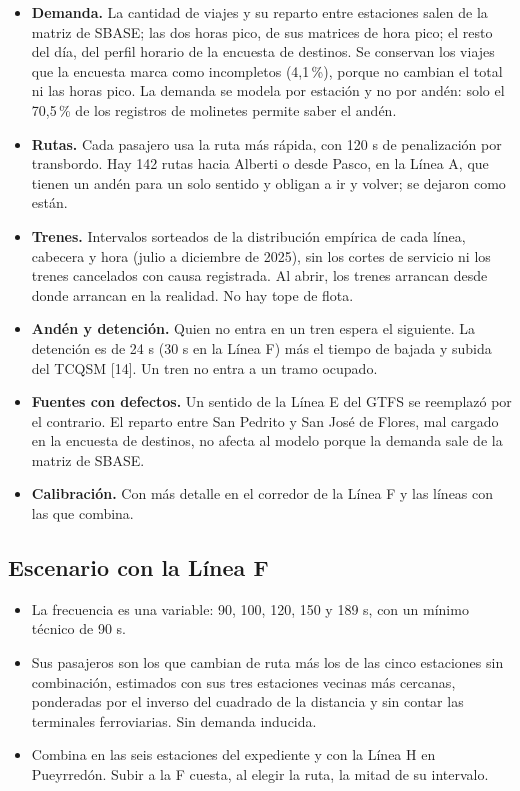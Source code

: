\documentclass{article}
\begin{document}
\begin{itemize}
  \item \textbf{Demanda.} La cantidad de viajes y su reparto entre estaciones salen de la matriz de SBASE; las
    dos horas pico, de sus matrices de hora pico; el resto del día, del perfil horario de la encuesta de
    destinos. Se conservan los viajes que la encuesta marca como incompletos (4,1\,\%), porque no cambian el
    total ni las horas pico. La demanda se modela por estación y no por andén: solo el 70,5\,\% de los
    registros de molinetes permite saber el andén.
  \item \textbf{Rutas.} Cada pasajero usa la ruta más rápida, con 120 s de penalización por transbordo. Hay
    142 rutas hacia Alberti o desde Pasco, en la Línea A, que tienen un andén para un solo sentido y obligan
    a ir y volver; se dejaron como están.
  \item \textbf{Trenes.} Intervalos sorteados de la distribución empírica de cada línea, cabecera y hora
    (julio a diciembre de 2025), sin los cortes de servicio ni los trenes cancelados con causa registrada.
    Al abrir, los trenes arrancan desde donde arrancan en la realidad. No hay tope de flota.
  \item \textbf{Andén y detención.} Quien no entra en un tren espera el siguiente. La detención es de 24 s
    (30 s en la Línea F) más el tiempo de bajada y subida del TCQSM [14]. Un tren no entra a un tramo ocupado.
  \item \textbf{Fuentes con defectos.} Un sentido de la Línea E del GTFS se reemplazó por el contrario. El
    reparto entre San Pedrito y San José de Flores, mal cargado en la encuesta de destinos, no afecta al
    modelo porque la demanda sale de la matriz de SBASE.
  \item \textbf{Calibración.} Con más detalle en el corredor de la Línea F y las líneas con las que combina.
\end{itemize}

\subsection*{Escenario con la Línea F}

\begin{itemize}
  \item La frecuencia es una variable: 90, 100, 120, 150 y 189 s, con un mínimo técnico de 90 s.
  \item Sus pasajeros son los que cambian de ruta más los de las cinco estaciones sin combinación, estimados
    con sus tres estaciones vecinas más cercanas, ponderadas por el inverso del cuadrado de la distancia y sin
    contar las terminales ferroviarias. Sin demanda inducida.
  \item Combina en las seis estaciones del expediente y con la Línea H en Pueyrredón. Subir a la F cuesta,
    al elegir la ruta, la mitad de su intervalo.
\end{itemize}
\end{document}
